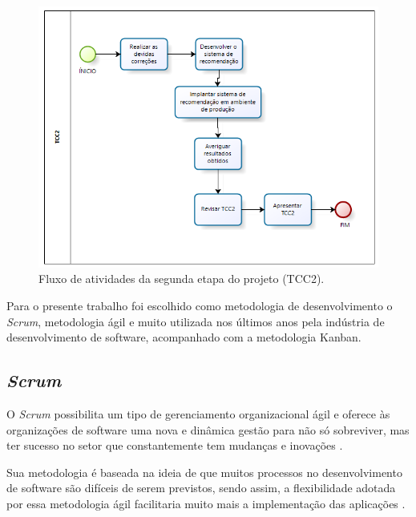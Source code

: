 \begin{figure}[H]
    \centering
    \includegraphics[scale=0.8]{figuras/proposta/fluxo_atividade_tcc2.png}
    \caption[Fluxo de atividades da segunda etapa do projeto (TCC2)]{Fluxo de atividades da segunda etapa do projeto (TCC2).}
    \label{fig:fluxo_atividade_tcc2}
\end{figure}


Para o presente trabalho foi escolhido como metodologia de desenvolvimento o \textit{Scrum}, metodologia ágil e muito utilizada nos últimos anos pela indústria de desenvolvimento de software, acompanhado com a metodologia Kanban.

\subsection{\textit{Scrum}}
\label{section_scrum}

O \textit{Scrum} possibilita um tipo de gerenciamento organizacional ágil e oferece às organizações de software uma nova e dinâmica gestão para não só sobreviver, mas ter sucesso no setor que constantemente tem mudanças e inovações \cite{ijcf94}.

Sua metodologia é baseada na ideia de que muitos processos no desenvolvimento de software são difíceis de serem previstos, sendo assim, a flexibilidade adotada por essa metodologia ágil facilitaria muito mais a implementação das aplicações \cite{ijcf94}.

